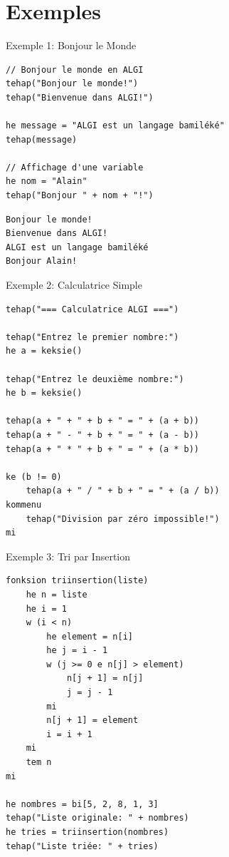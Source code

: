 \documentclass[10pt]{beamer}
\begin{document}
\section{Exemples}

\begin{frame}[fragile]{Exemple 1: Bonjour le Monde}
    \begin{lstlisting}[style=algi-style, caption={bonjour.algi}]
// Bonjour le monde en ALGI
tehap("Bonjour le monde!")
tehap("Bienvenue dans ALGI!")

he message = "ALGI est un langage bamiléké"
tehap(message)

// Affichage d'une variable
he nom = "Alain"
tehap("Bonjour " + nom + "!")
\end{lstlisting}
    \begin{lstlisting}[style=algi-style, caption={Résultat}]
Bonjour le monde!
Bienvenue dans ALGI!
ALGI est un langage bamiléké
Bonjour Alain!
\end{lstlisting}
\end{frame}

\begin{frame}[fragile]{Exemple 2: Calculatrice Simple}
    \begin{lstlisting}[style=algi-style, caption={calculatrice.algi}]
tehap("=== Calculatrice ALGI ===")

tehap("Entrez le premier nombre:")
he a = keksie()

tehap("Entrez le deuxième nombre:")
he b = keksie()

tehap(a + " + " + b + " = " + (a + b))
tehap(a + " - " + b + " = " + (a - b))
tehap(a + " * " + b + " = " + (a * b))

ke (b != 0)
    tehap(a + " / " + b + " = " + (a / b))
kommenu
    tehap("Division par zéro impossible!")
mi
\end{lstlisting}
\end{frame}

\begin{frame}[fragile]{Exemple 3: Tri par Insertion}
    \begin{lstlisting}[style=algi-style, caption={triinsertion.algi}]
fonksion triinsertion(liste)
    he n = liste
    he i = 1 
    w (i < n)
        he element = n[i]
        he j = i - 1       
        w (j >= 0 e n[j] > element)
            n[j + 1] = n[j]
            j = j - 1
        mi  
        n[j + 1] = element
        i = i + 1
    mi 
    tem n
mi

he nombres = bi[5, 2, 8, 1, 3]
tehap("Liste originale: " + nombres)
he tries = triinsertion(nombres)
tehap("Liste triée: " + tries)
\end{lstlisting}
\end{frame}
\end{document}
